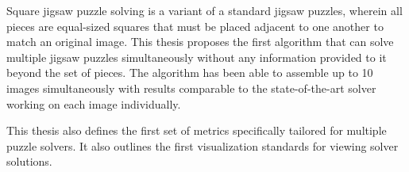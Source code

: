 Square jigsaw puzzle solving is a variant of a standard jigsaw puzzles, wherein all pieces are equal-sized squares that must be placed adjacent to one another to match an original image.  This thesis proposes the first algorithm that can solve multiple jigsaw puzzles simultaneously without any information provided to it beyond the set of pieces.  The algorithm has been able to assemble up to 10 images simultaneously with results comparable to the state-of-the-art solver working on each image individually.

This thesis also defines the first set of metrics specifically tailored for multiple puzzle solvers.  It also outlines the first visualization standards for viewing solver solutions.
